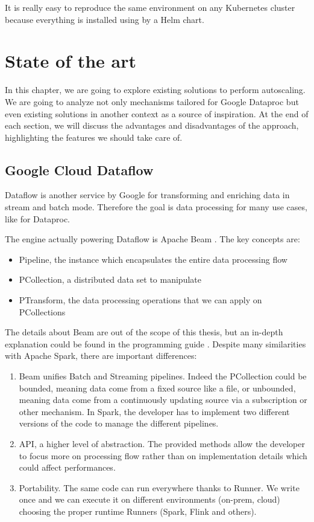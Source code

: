 \documentclass[12pt,twoside,cucitura]{toptesi}
\begin{document}
It is really easy to reproduce the same environment on any Kubernetes cluster because everything is installed using by a Helm \cite{helm} chart.

\chapter{State of the art}
In this chapter, we are going to explore existing solutions to perform autoscaling. We are going to analyze not only mechanisms tailored for Google Dataproc but even existing solutions in another context as a source of inspiration. At the end of each section, we will discuss the advantages and disadvantages of the approach, highlighting the features we should take care of.

\section{Google Cloud Dataflow}
Dataflow \cite{dataflow} is another service by Google for transforming and enriching data in stream and batch mode. Therefore the goal is data processing for many use cases, like for Dataproc.

The engine actually powering Dataflow is Apache Beam \cite{beam}. The key concepts are: 
\begin{itemize}
  \item Pipeline, the instance which encapsulates the entire data processing flow
  \item PCollection, a distributed data set to manipulate
  \item PTransform, the data processing operations that we can apply on PCollections
 \end{itemize}

The details about Beam are out of the scope of this thesis, but an in-depth explanation could be found in the programming guide \cite{beam_docs}. 
Despite many similarities with Apache Spark, there are important differences:
 \begin{enumerate}
 	\item Beam unifies Batch and Streaming pipelines. Indeed the PCollection could be bounded, meaning data come from a fixed source like a file, or unbounded, meaning data come from a continuously updating source via a subscription or other mechanism. In Spark, the developer has to implement two different versions of the code to manage the different pipelines.
 	\item API, a higher level of abstraction. The provided methods allow the developer to focus more on processing flow rather than on implementation details which could affect performances.
 	\item Portability. The same code can run everywhere thanks to Runner. We write once and we can execute it on different environments (on-prem, cloud) choosing the proper runtime Runners (Spark, Flink and others).
 \end{enumerate}
 
\end{document}
